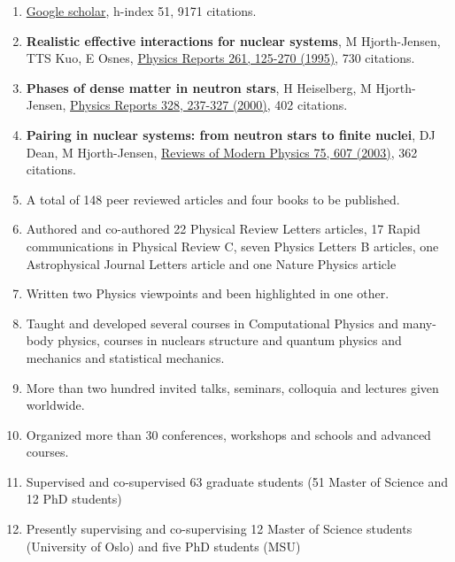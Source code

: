 \documentclass[a4wide,10pt]{article}
\begin{document}
\begin{enumerate}
\item \href{{https://scholar.google.com/citations?user=nuiyEmwAAAAJ&hl=en}}{Google scholar}, h-index 51, 9171 citations.

\item \textbf{Realistic effective interactions for nuclear systems}, M Hjorth-Jensen, TTS Kuo, E Osnes, \href{{http://www.sciencedirect.com/science/article/pii/0370157395000126}}{Physics Reports 261, 125-270 (1995)}, 730 citations.

\item \textbf{Phases of dense matter in neutron stars}, H Heiselberg, M Hjorth-Jensen, \href{{http://www.sciencedirect.com/science/article/pii/S0370157399001106}}{Physics Reports 328, 237-327 (2000)}, 402 citations.

\item \textbf{Pairing in nuclear systems: from neutron stars to finite nuclei}, DJ Dean, M Hjorth-Jensen, \href{{http://journals.aps.org/rmp/abstract/10.1103/RevModPhys.75.607}}{Reviews of Modern Physics 75, 607  (2003)}, 362 citations.

\item A total of 148 peer reviewed articles and four books to be published.

\item Authored and co-authored 22 Physical Review Letters articles, 17 Rapid communications in Physical Review C, seven Physics Letters B articles, one Astrophysical Journal Letters article and one Nature Physics article

\item Written two Physics viewpoints and been highlighted in one other.

\item Taught and developed several courses in Computational Physics and many-body physics, courses in nuclears structure and quantum physics and mechanics and statistical mechanics.

\item More than two hundred invited talks, seminars, colloquia and lectures given worldwide.

\item Organized more than 30 conferences, workshops and schools and advanced courses.

\item Supervised and co-supervised 63 graduate students (51 Master of Science and 12 PhD students)

\item Presently supervising and co-supervising 12 Master of Science students (University of Oslo) and five PhD students (MSU)

\end{enumerate}
\end{document}
